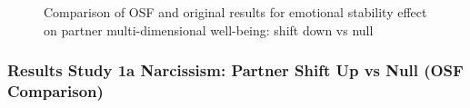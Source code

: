 \documentclass[
  singlecolumn]{article}
\begin{document}
\begin{figure}


\caption{\label{fig-results-emotional-stability-partner-down-comparison}Comparison
of OSF and original results for emotional stability effect on partner
multi-dimensional well-being: shift down vs null}

\end{figure}%

\newpage{}

\subsubsection{Results Study 1a Narcissism: Partner Shift Up vs Null
(OSF
Comparison)}\label{results-study-1a-narcissism-partner-shift-up-vs-null-osf-comparison}
\end{document}
